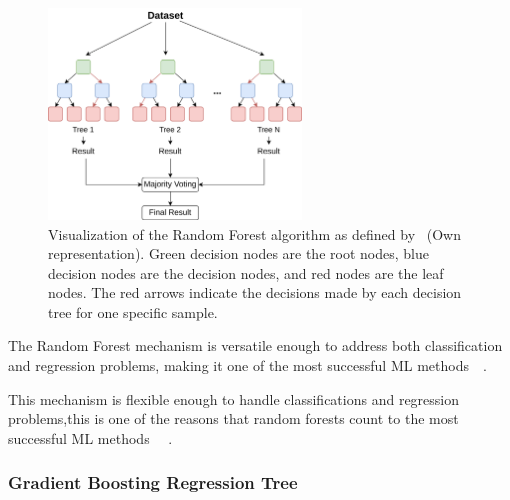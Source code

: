 \begin{figure}[h]
    \begin{tcolorbox}[arc=0pt,boxrule=0.5pt]
        \centering
        \includegraphics[width=0.6\textwidth]{chap4/images/random_forest_example}
    \end{tcolorbox}
    \caption{Visualization of the Random Forest algorithm as defined by~\cite[p.1]{breiman_randomforests_2001} (Own
    representation).
    Green decision nodes are the root nodes, blue decision nodes are the decision nodes, and red nodes are the leaf
    nodes.
    The red arrows indicate the decisions made by each decision tree for one specific sample.}
    \label{fig:rf-example}
\end{figure}

The Random Forest mechanism is versatile enough to address both classification and regression problems, making it one
of the most successful
\ac{ML} methods~\cite[p. 3--4]{biau_randomforestguided_2016}~\cite[p. 25]{breiman_randomforests_2001}.

This mechanism is flexible enough to handle classifications and regression problems,this is one of the reasons that
random forests count to the most successful \ac{ML}
methods
~\cite[p. 3--4]{biau_randomforestguided_2016}~\cite[p. 25]{breiman_randomforests_2001}.

\subsubsection{Gradient Boosting Regression Tree}

